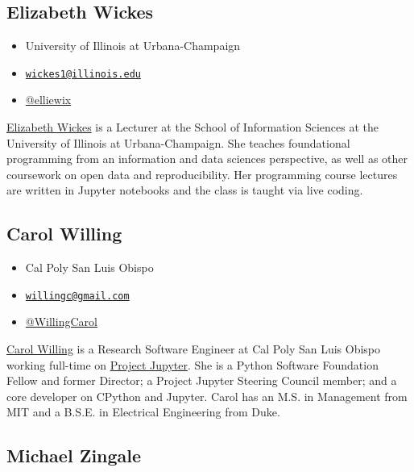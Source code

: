 \documentclass[]{book}
\providecommand{\tightlist}{%
  \setlength{\itemsep}{0pt}\setlength{\parskip}{0pt}}
\begin{document}
\subsection*{Elizabeth Wickes}\label{elizabeth-wickes}

\begin{itemize}
\tightlist
\item
  University of Illinois at Urbana-Champaign
\item
  \href{mailto:wickes1@illinois.edu}{\nolinkurl{wickes1@illinois.edu}}
\item
  \href{https://twitter.com/elliewix}{@elliewix}
\end{itemize}

\href{https://ischool.illinois.edu/people/elizabeth-wickes}{Elizabeth
Wickes} is a Lecturer at the School of Information Sciences at the
University of Illinois at Urbana-Champaign. She teaches foundational
programming from an information and data sciences perspective, as well
as other coursework on open data and reproducibility. Her programming
course lectures are written in Jupyter notebooks and the class is taught
via live coding.

\subsection*{Carol Willing}\label{carol-willing}

\begin{itemize}
\tightlist
\item
  Cal Poly San Luis Obispo
\item
  \href{mailto:willingc@gmail.com}{\nolinkurl{willingc@gmail.com}}
\item
  \href{https://twitter.com/WillingCarol}{@WillingCarol}
\end{itemize}

\href{https://www.willingconsulting.com/about/}{Carol Willing} is a
Research Software Engineer at Cal Poly San Luis Obispo working full-time
on \href{https://jupyter.org/}{Project Jupyter}. She is a Python
Software Foundation Fellow and former Director; a Project Jupyter
Steering Council member; and a core developer on CPython and Jupyter.
Carol has an M.S. in Management from MIT and a B.S.E. in Electrical
Engineering from Duke.

\subsection*{Michael Zingale}\label{michael-zingale}
\end{document}

